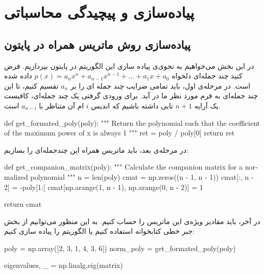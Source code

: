 \chapter{پیاده‌سازی و پیچیدگی محاسباتی}

\section{پیاده‌سازی روش ماتریس همراه در پایتون}

در این بخش می‌خواهیم به نحوی‌ی پیاده سازی این الگوریتم در پایتون بپردازیم.
فرض کنید چند جمله‌ای دلخواه
$p(x) = a_n x^n + a_{n-1} x^{n-1} + ... + a_1x + a_0$
داده شده است.
در مرحله‌ی اول، باید تمامی ضرایب چند جمله ای را بر
$a_n$
تقسیم کنیم، تا این چند جمله‌ای به فرم مورد نظر ما در آید.
برای ورودی گرفتی یک چند جمله‌ای، کافیست یک آرایه
$n + 1$
تایی داشته باشیم که اندیس
$i$
ام آن متناظر با
$a_{n-i}$
است.

\begin{latin}
  \begin{python}
def get_formated_poly(poly):
    """
    Return the polynomial such that the coefficient of the maximum power of x
    is always 1
    """
    ret = poly / poly[0]
    return ret

  \end{python}
\end{latin}

در مرحله‌ی بعد، باید ماتریس همراه این چندجمله‌ای را بسازیم:
\begin{latin}
  \begin{python}
def get_companion_matrix(poly):
    """
    Calculate the companion matrix for a normalized polynomial
    """
    n = len(poly)
    cmat = np.zeros((n - 1, n - 1))
    cmat[:, n - 2] = -poly[1:]
    cmat[np.arange(1, n - 1), np.arange(0, n - 2)] = 1

    return cmat

  \end{python}
\end{latin}

در آخر، باید مقادیر ویژه‌ی این ماتریس را حساب کنیم. به این منظور می‌توانیم از بخش جبر خطی کتابخوانه
استفاده کنیم یا الگوریتم
را پیاده سازی کنیم:

\begin{latin}
  \begin{python}
poly = np.array([2, 3, 1, 4, 3, 6])
norm_poly = get_formated_poly(poly)

eigenvalues, _ = np.linalg.eig(matrix)

  \end{python}
\end{latin}

